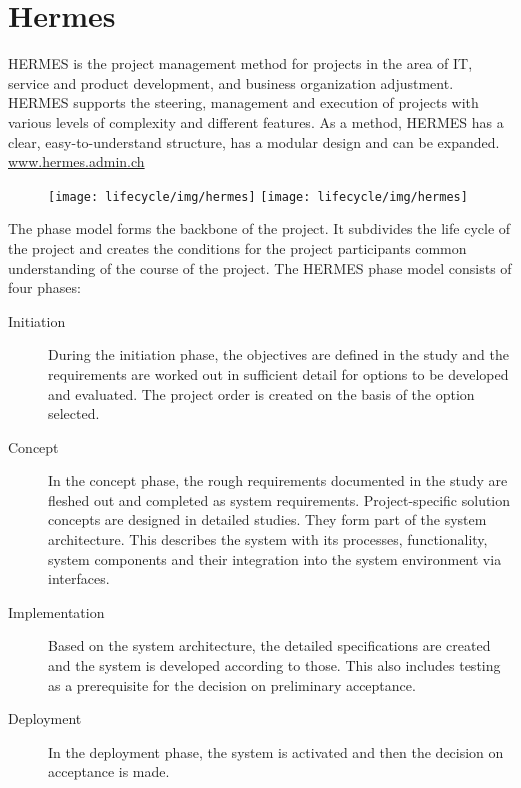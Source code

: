 \begin{minipage}[t]{0.5\linewidth}
\section{Hermes}
\ifslides
\else
HERMES is the project management method for projects in the area of IT,
service and product development, and business organization adjustment.
HERMES supports the steering, management and execution of projects with various
levels of complexity and different features. As a method, HERMES has a clear,
easy-to-understand structure, has a modular design and can be expanded.
 \href{https://www.hermes.admin.ch}{www.hermes.admin.ch}
\begin{figure}[H]
\fi
\begin{center}
\ifslides
\texttt{[image: lifecycle/img/hermes]}
\else
\texttt{[image: lifecycle/img/hermes]}
\fi
\end{center}
\ifslides
\else
\end{figure}
\fi
The phase model forms the backbone of the project. It subdivides the life
cycle of the project and creates the conditions for the project participants
common understanding of the course of the project. The HERMES phase model
consists of four phases:
\begin{description}
\item[Initiation] During the initiation phase, the objectives are defined in
the study and the requirements are worked out in sufficient detail for options
to be developed and evaluated. The project order is created on the basis of the
option selected.
\item[Concept] In the concept phase, the rough requirements documented in the
study are fleshed out and completed as system requirements. Project-specific
solution concepts are designed in detailed studies. They form part of the system
architecture. This describes the system with its processes, functionality,
system components and their integration into the system environment via interfaces.
\item[Implementation] Based on the system architecture, the detailed
specifications are created and the system is developed according to those.
This also includes testing as a prerequisite for the decision on preliminary
acceptance.
\item[Deployment] In the deployment phase, the system is activated and then the
decision on acceptance is made.
\end{description}


\end{minipage}
